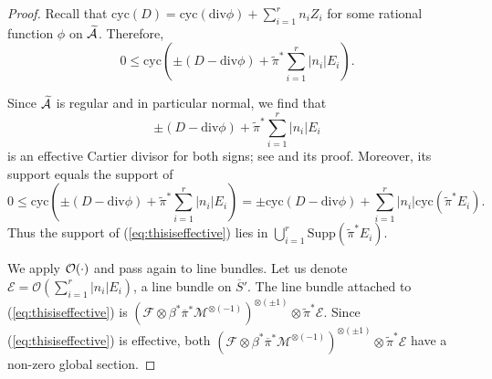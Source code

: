 \begin{proof}
Recall that $\mathrm{cyc}(D) = \mathrm{cyc}(\mathrm{div}\phi) +
\sum_{i=1}^r n_i Z_i$ for some rational function $\phi$ on
$\widetilde{\mathcal{A}}$. Therefore,
\begin{equation*}
0\le   \mathrm{cyc}\left(\pm (D-\mathrm{div}\phi) + \widetilde\pi^*\sum_{i=1}^r |n_i| E_i\right).
\end{equation*}

Since $\widetilde{\mathcal{A}}$ is regular and in particular normal, we find  that 
\begin{equation}
\label{eq:thisiseffective}\pm(D - \mathrm{div}\phi) + \widetilde\pi^*\sum_{i=1}^r |n_i|E_i
\end{equation}
is an effective Cartier divisor for both  signs;
see \cite[Theorem~11.38(1)]{GoertzWedhorn} and its proof.
Moreover, its support equals the support of 
$$0\le \mathrm{cyc}\left(\pm (D-\mathrm{div}\phi) + \widetilde\pi^*\sum_{i=1}^r |n_i|
  E_i\right) =
\pm \mathrm{cyc}(D-\mathrm{div}\phi) + \sum_{i=1}^r |n_i|\mathrm{cyc}(\widetilde\pi^*E_i).$$
Thus the support of (\ref{eq:thisiseffective}) lies in
$\bigcup_{i=1}^r \mathrm{Supp}(\widetilde\pi^* E_i)$. 


We apply ${\mathcal O}(\cdot)$ and pass  again  to line bundles.
Let us denote $\mathcal{E} = \mathcal{O}(\sum_{i=1}^r |n_i| E_i)$, a
line bundle on $\overline S'$. The line bundle attached to 
 (\ref{eq:thisiseffective}) is $(\mathcal{F}\otimes\beta^*\overline\pi^*\mathcal{M}^{\otimes(-1)} 
 )^{\otimes(\pm 1)}\otimes\widetilde\pi^*\mathcal{E}$.
 Since (\ref{eq:thisiseffective}) is effective, both
$(\mathcal{F}\otimes\beta^*\overline\pi^*\mathcal{M}^{\otimes(-1)} 
 )^{\otimes(\pm 1)}\otimes \widetilde\pi^*\mathcal{E}$
have a non-zero global
 section.


\end{proof}
